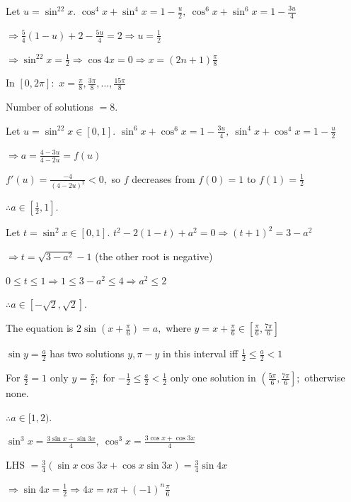 \item Let $u = \sin^22x.$ $\cos^4x + \sin^4x = 1 - \frac{u}{2},~\cos^6x + \sin^6x = 1 - \frac{3u}{4}$

  $\Rightarrow \frac{5}{4}(1 - u) + 2 - \frac{5u}{4} = 2 \Rightarrow u = \frac{1}{2}$

  $\Rightarrow \sin^22x = \frac{1}{2} \Rightarrow \cos4x = 0 \Rightarrow x = (2n + 1)\frac{\pi}{8}$

  In $[0, 2\pi]:$ $x = \frac{\pi}{8}, \frac{3\pi}{8}, \ldots, \frac{15\pi}{8}$

  Number of solutions $= 8.$

\item Let $u = \sin^22x\in[0, 1].$ $\sin^6x + \cos^6x = 1 - \frac{3u}{4},~\sin^4x + \cos^4x = 1 - \frac{u}{2}$

  $\Rightarrow a = \frac{4 - 3u}{4 - 2u} = f(u)$

  $f'(u) = \frac{-4}{(4 - 2u)^2} < 0,$ so $f$ decreases from $f(0) = 1$ to $f(1) = \frac{1}{2}$

  $\therefore a\in\left[\frac{1}{2}, 1\right].$

\item Let $t = \sin^2x\in[0, 1].$ $t^2 - 2(1 - t) + a^2 = 0 \Rightarrow (t + 1)^2 = 3 - a^2$

  $\Rightarrow t = \sqrt{3 - a^2} - 1$ (the other root is negative)

  $0\leq t\leq 1 \Rightarrow 1\leq 3 - a^2\leq 4 \Rightarrow a^2\leq 2$

  $\therefore a\in[-\sqrt{2}, \sqrt{2}].$

\item The equation is $2\sin\left(x + \frac{\pi}{6}\right) = a,$ where $y = x + \frac{\pi}{6}\in\left[\frac{\pi}{6},
  \frac{7\pi}{6}\right]$

  $\sin y = \frac{a}{2}$ has two solutions $y, \pi - y$ in this interval iff $\frac{1}{2}\leq\frac{a}{2} < 1$

  For $\frac{a}{2} = 1$ only $y = \frac{\pi}{2};$ for $-\frac{1}{2}\leq\frac{a}{2} < \frac{1}{2}$ only one solution in
  $\left(\frac{5\pi}{6}, \frac{7\pi}{6}\right];$ otherwise none.

  $\therefore a\in[1, 2).$

\item $\sin^3x = \frac{3\sin x - \sin3x}{4},~\cos^3x = \frac{3\cos x + \cos3x}{4}$

  LHS $= \frac{3}{4}(\sin x\cos3x + \cos x\sin3x) = \frac{3}{4}\sin4x$

  $\Rightarrow \sin4x = \frac{1}{2} \Rightarrow 4x = n\pi + (-1)^n\frac{\pi}{6}$

